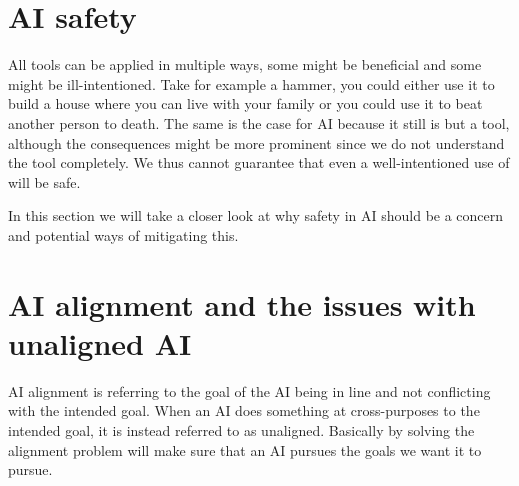 \documentclass[12pt,A4]{report}
\theoremstyle{definition}
\begin{document}
\section{AI safety}
All tools can be applied in multiple ways, some might be beneficial and some might be ill-intentioned. Take for example a hammer, you could either use it to build a house where you can live with your family or you could use it to beat another person to death. The same is the case for AI because it still is but a tool, although the consequences might be more prominent since we do not understand the tool completely. We thus cannot guarantee that even a well-intentioned use of will be safe.

In this section we will take a closer look at why safety in AI should be a concern and potential ways of mitigating this. 

\section{AI alignment and the issues with unaligned AI}
AI alignment is referring to the goal of the AI being in line and not conflicting with the intended goal. When an AI does something at cross-purposes to the intended goal, it is instead referred to as unaligned. Basically by solving the alignment problem will make sure that an AI pursues the goals we want it to pursue.



\end{document}
